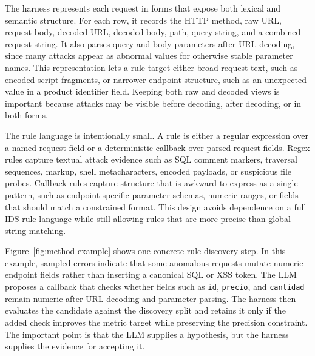 \documentclass[letterpaper,twocolumn,10pt]{article}
\begin{document}
The harness represents each request in forms that expose both lexical and semantic structure. For each row, it records the HTTP method, raw URL, request body, decoded URL, decoded body, path, query string, and a combined request string. It also parses query and body parameters after URL decoding, since many attacks appear as abnormal values for otherwise stable parameter names. This representation lets a rule target either broad request text, such as encoded script fragments, or narrower endpoint structure, such as an unexpected value in a product identifier field. Keeping both raw and decoded views is important because attacks may be visible before decoding, after decoding, or in both forms.

The rule language is intentionally small. A rule is either a regular expression over a named request field or a deterministic callback over parsed request fields. Regex rules capture textual attack evidence such as SQL comment markers, traversal sequences, markup, shell metacharacters, encoded payloads, or suspicious file probes. Callback rules capture structure that is awkward to express as a single pattern, such as endpoint-specific parameter schemas, numeric ranges, or fields that should match a constrained format. This design avoids dependence on a full IDS rule language while still allowing rules that are more precise than global string matching.

Figure~\ref{fig:method-example} shows one concrete rule-discovery step. In this example, sampled errors indicate that some anomalous requests mutate numeric endpoint fields rather than inserting a canonical SQL or XSS token. The LLM proposes a callback that checks whether fields such as \texttt{id}, \texttt{precio}, and \texttt{cantidad} remain numeric after URL decoding and parameter parsing. The harness then evaluates the candidate against the discovery split and retains it only if the added check improves the metric target while preserving the precision constraint. The important point is that the LLM supplies a hypothesis, but the harness supplies the evidence for accepting it.
\end{document}
